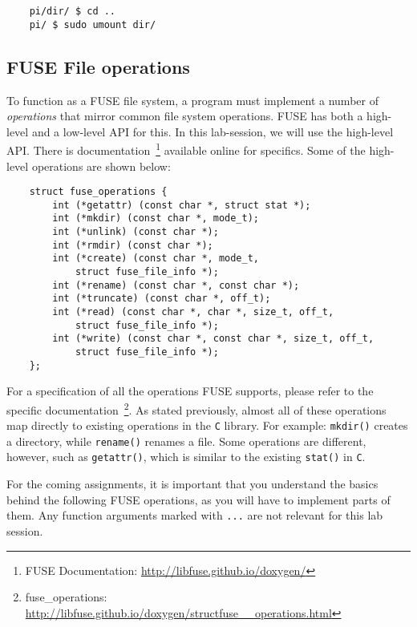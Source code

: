 \documentclass [a4,twoside,11pt] {article}
\begin{document}
    \begin{verbatim}
    pi/dir/ $ cd ..
    pi/ $ sudo umount dir/\end{verbatim}
    
    \newpage
    \subsection{FUSE File operations}

    To function as a FUSE file system, a program must implement a number of \textit{operations} that mirror common file system operations. FUSE has both a high-level and a low-level API for this. In this lab-session, we will use the high-level API. There is documentation~\footnote{FUSE Documentation: \url{http://libfuse.github.io/doxygen/}} available online for specifics. Some of the high-level operations are shown below:

    \begin{verbatim}
    struct fuse_operations {
        int (*getattr) (const char *, struct stat *);
        int (*mkdir) (const char *, mode_t);
        int (*unlink) (const char *);
        int (*rmdir) (const char *);
        int (*create) (const char *, mode_t, 
            struct fuse_file_info *);
        int (*rename) (const char *, const char *);
        int (*truncate) (const char *, off_t);
        int (*read) (const char *, char *, size_t, off_t, 
            struct fuse_file_info *);
        int (*write) (const char *, const char *, size_t, off_t, 
            struct fuse_file_info *);
    };\end{verbatim}

    For a specification of all the operations FUSE supports, please refer to the specific documentation~\footnote{fuse\_operations: \url{http://libfuse.github.io/doxygen/structfuse\_\_operations.html}}. As stated previously, almost all of these operations map directly to existing operations in the \texttt{C} library. For example: \texttt{mkdir()} creates a directory, while \texttt{rename()} renames a file. Some operations are different, however, such as \texttt{getattr()}, which is similar to the existing \texttt{stat()} in \texttt{C}.

    For the coming assignments, it is important that you understand the basics behind the following FUSE operations, as you will have to implement parts of them. Any function arguments marked with \texttt{...} are not relevant for this lab session.
\end{document}
